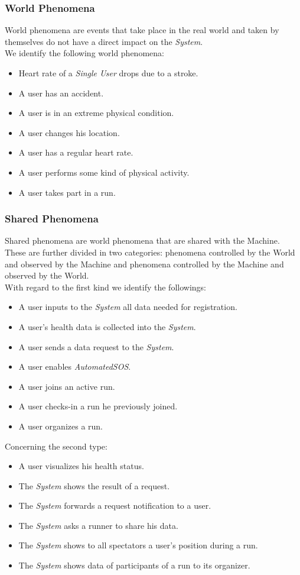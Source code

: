 \documentclass[titlepage]{article}
\begin{document}
		\subsubsection{World Phenomena}
		World phenomena are events that take place in the real world and taken by themselves do not have a direct impact on the {\it System}.\\
We identify the following world phenomena:
		\begin{itemize}
			\item Heart rate of a {\it Single User} drops due to a stroke.
			\item A user has an accident.
			\item A user is in an extreme physical condition.
			\item A user changes his location.
			\item A user has a regular heart rate.
			\item A user performs some kind of physical activity.
			\item A user takes part in a run.
		\end{itemize}

		\subsubsection{Shared Phenomena}
		Shared phenomena are world phenomena that are shared with the Machine.\\
These are further divided in two categories: phenomena controlled by the World and observed by the Machine and phenomena controlled by the Machine and observed by the World.\\
With regard to the first kind we identify the followings:
		\begin{itemize}
			\item A user inputs to the {\it System} all data needed for registration.
			\item A user’s health data is collected into the {\it System}.
			\item A user sends a data request to the {\it System}.
			\item A user enables {\it AutomatedSOS}.
			\item A user joins an active run.
			\item A user checks-in a run he previously joined.
			\item A user organizes a run.\\
		\end{itemize}
Concerning the second type:	
		\begin{itemize}
			\item A user visualizes his health status.
			\item The {\it System} shows the result of a request.
			\item The {\it System} forwards a request notification to a user.
			\item The {\it System} asks a runner to share his data.
			\item The {\it System} shows to all spectators a user’s position during a run.
			\item The {\it System} shows data of participants of a run to its organizer.
		\end{itemize}	
		
\end{document}
